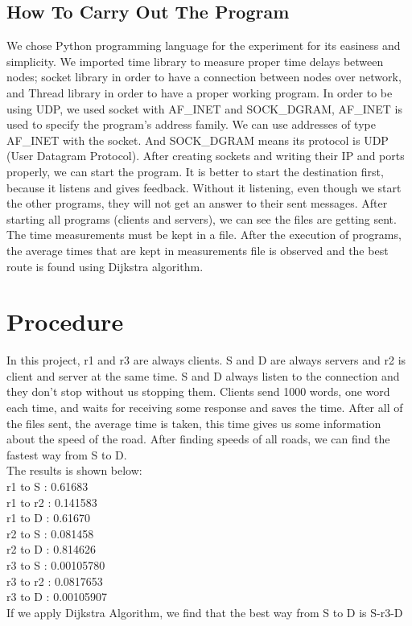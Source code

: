 \documentclass[conference]{IEEEtran}
\begin{document}
\subsection{How To Carry Out The Program}
We chose Python programming language for the experiment for its easiness and simplicity. We imported time library to measure proper time delays between nodes; socket library in order to have a connection between nodes over network, and Thread library in order to have a proper working program. In order to be using UDP, we used socket with AF\_INET and SOCK\_DGRAM, AF\_INET is used to specify the program's address family. We can use addresses of type AF\_INET with the socket. And SOCK\_DGRAM means its protocol is UDP (User Datagram Protocol). After creating sockets and writing their IP and ports properly, we can start the program. It is better to start the destination first, because it listens and gives feedback. Without it listening, even though we start the other programs, they will not get an answer to their sent messages. After starting all programs (clients and servers), we can see the files are getting sent. The time measurements must be kept in a file. After the execution of programs, the average times that are kept in measurements file is observed and the best route is found using Dijkstra algorithm. 

\section{Procedure}
In this project, r1 and r3 are always clients. S and D are always servers and r2 is client and server at the same time. S and D always listen to the connection and they don't stop without us stopping them. Clients send 1000 words, one word each time, and waits for receiving some response and saves the time. After all of the files sent, the average time is taken, this time gives us some information about the speed of the road. After finding speeds of all roads, we can find the fastest way from S to D. \\
The results is shown below:\\
r1 to S  : 0.61683\\
r1 to r2 : 0.141583\\
r1 to D  : 0.61670\\
r2 to S  : 0.081458\\
r2 to D  : 0.814626\\
r3 to S  : 0.00105780\\
r3 to r2 : 0.0817653\\
r3 to D  : 0.00105907\\
If we apply Dijkstra Algorithm, we find that the best way from S to D is S-r3-D
\end{document}

